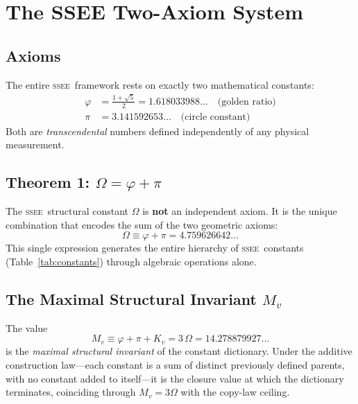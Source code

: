 \documentclass[12pt,a4paper]{article}
\newcommand{\SSEE}{\ifmmode\mathrm{SSEE}\else\textsc{ssee}\fi}
\begin{document}
\section{The SSEE Two-Axiom System}
\label{sec:constants}

\subsection{Axioms}

The entire \SSEE\ framework rests on exactly two mathematical constants:
\begin{align}
\varphi &= \frac{1+\sqrt{5}}{2} = 1.618033988\ldots
          \quad\text{(golden ratio)} \\
\pi     &= 3.141592653\ldots
          \quad\text{(circle constant)}
\end{align}
Both are \emph{transcendental} numbers defined independently of any physical
measurement.

\subsection{Theorem 1: \texorpdfstring{$\Omega = \varphi+\pi$}{Omega = phi+pi}}
\label{sec:omega}

The \SSEE\ structural constant $\Omega$ is \textbf{not} an independent axiom.
It is the unique combination that encodes the sum of the two geometric axioms:
\begin{equation}
\Omega \equiv \varphi + \pi = 4.759626642\ldots
\label{eq:omega}
\end{equation}
This single expression generates the entire hierarchy of \SSEE\ constants
(Table~\ref{tab:constants}) through algebraic operations alone.

\subsection{The Maximal Structural Invariant \texorpdfstring{$M_v$}{M_v}}
\label{sec:sovereigns}

The value
\begin{equation}
M_v \equiv \varphi+\pi+K_v = 3\,\Omega = 14.278879927\ldots
\label{eq:sigma9}
\end{equation}
is the \emph{maximal structural invariant} of the constant dictionary. Under the
additive construction law---each constant is a sum of distinct previously defined
parents, with no constant added to itself---it is the closure value at which the
dictionary terminates, coinciding through $M_v=3\Omega$ with the copy-law ceiling.
\end{document}
